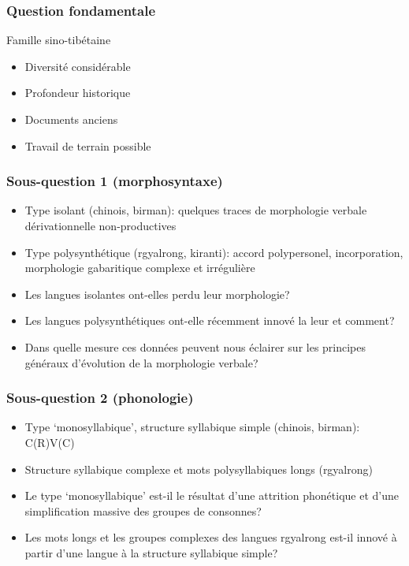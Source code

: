 \documentclass[xcolor=table]{beamer}
\newcommand{\bleu}[1]{{\color{blue}#1}}
\begin{document}
\begin{frame} 
\frametitle{Question fondamentale}

Famille \bleu{sino-tibétaine}

\begin{itemize}[<+->] 
\item Diversité considérable 
\item Profondeur historique
\item Documents anciens 
\item Travail de terrain possible
\end{itemize}
\end{frame} 

  
\begin{frame} 
\frametitle{Sous-question 1 (morphosyntaxe)}

\begin{itemize}[<+->]
\item Type \bleu{isolant} (chinois, birman): quelques traces de morphologie verbale dérivationnelle non-productives
\item Type \bleu{polysynthétique} (rgyalrong, kiranti): accord polypersonel, incorporation, morphologie gabaritique complexe et irrégulière 
\item Les langues isolantes ont-elles perdu leur morphologie?
\item Les langues polysynthétiques ont-elle récemment innové la leur et comment?
\item Dans quelle mesure ces données peuvent nous éclairer sur les principes généraux d'évolution de la morphologie verbale?
\end{itemize}

\end{frame} 


\begin{frame} 
\frametitle{Sous-question 2 (phonologie)}

\begin{itemize}[<+->]
\item Type `monosyllabique', structure syllabique simple (chinois, birman): C(R)V(C)
\item Structure syllabique complexe et mots polysyllabiques longs (rgyalrong)
\item Le type `monosyllabique' est-il le résultat d'une attrition phonétique et d'une simplification massive des groupes de consonnes?
\item Les mots longs et les groupes complexes des langues rgyalrong est-il innové à partir d'une langue à la structure syllabique simple? 
\end{itemize}

\end{frame} 
\end{document}
